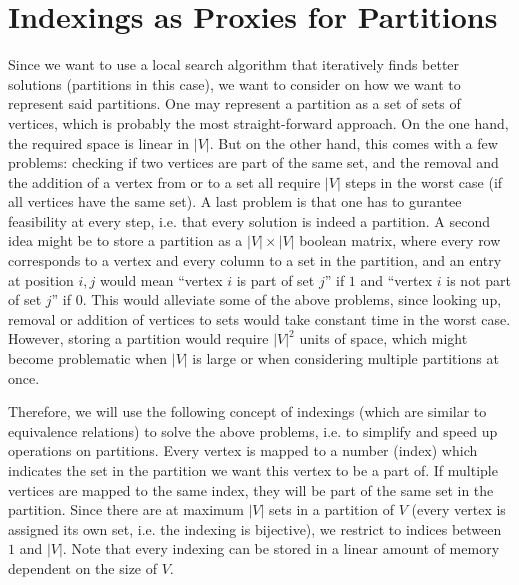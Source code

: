 \section{Indexings as Proxies for Partitions}
Since we want to use a local search algorithm that iteratively finds better solutions (partitions in this case), we want to consider on how we want to represent said partitions. One may represent a partition as a set of sets of vertices, which is probably the most straight-forward approach. On the one hand, the required space is linear in $|V|$. But on the other hand, this comes with a few problems: checking if two vertices are part of the same set, and the removal and the addition of a vertex from or to a set all require $|V|$ steps in the worst case (if all vertices have the same set). A last problem is that one has to gurantee feasibility at every step, i.e. that every solution is indeed a partition. A second idea might be to store a partition as a $|V| \times |V|$ boolean matrix, where every row corresponds to a vertex and every column to a set in the partition, and an entry at position $i,j$ would mean ``vertex $i$ is part of set $j$'' if $1$ and ``vertex $i$ is not part of set $j$'' if $0$. This would alleviate some of the above problems, since looking up, removal or addition of vertices to sets would take constant time in the worst case. However, storing a partition would require $|V|^2$ units of space, which might become problematic when $|V|$ is large or when considering multiple partitions at once.

Therefore, we will use the following concept of indexings (which are similar to equivalence relations) to solve the above problems, i.e. to simplify and speed up operations on partitions. Every vertex is mapped to a number (index) which indicates the set in the partition we want this vertex to be a part of. If multiple vertices are mapped to the same index, they will be part of the same set in the partition. Since there are at maximum $|V|$ sets in a partition of $V$ (every vertex is assigned its own set, i.e. the indexing is bijective), we restrict to indices between $1$ and $|V|$. Note that every indexing can be stored in a linear amount of memory dependent on the size of $V$.


